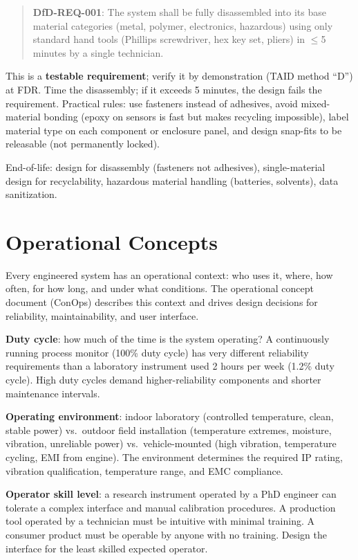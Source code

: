 \documentclass[11pt,letterpaper,twoside,openany]{book}
\begin{document}
\begin{quote}
\textbf{DfD-REQ-001}: The system shall be fully disassembled into its base material categories (metal, polymer, electronics, hazardous) using only standard hand tools (Phillips screwdriver, hex key set, pliers) in $\leq$5 minutes by a single technician.
\end{quote}

This is a \textbf{testable requirement}; verify it by demonstration (TAID method ``D'') at FDR. Time the disassembly; if it exceeds 5 minutes, the design fails the requirement. Practical rules: use fasteners instead of adhesives, avoid mixed-material bonding (epoxy on sensors is fast but makes recycling impossible), label material type on each component or enclosure panel, and design snap-fits to be releasable (not permanently locked).

End-of-life: design for disassembly (fasteners not adhesives), single-material design for recyclability, hazardous material handling (batteries, solvents), data sanitization.


\section{Operational Concepts}
Every engineered system has an operational context: who uses it, where, how often, for how long, and under what conditions. The operational concept document (ConOps) describes this context and drives design decisions for reliability, maintainability, and user interface.

\textbf{Duty cycle}: how much of the time is the system operating? A continuously running process monitor (100\% duty cycle) has very different reliability requirements than a laboratory instrument used 2 hours per week (1.2\% duty cycle). High duty cycles demand higher-reliability components and shorter maintenance intervals.

\textbf{Operating environment}: indoor laboratory (controlled temperature, clean, stable power) vs.\ outdoor field installation (temperature extremes, moisture, vibration, unreliable power) vs.\ vehicle-mounted (high vibration, temperature cycling, EMI from engine). The environment determines the required IP rating, vibration qualification, temperature range, and EMC compliance.

\textbf{Operator skill level}: a research instrument operated by a PhD engineer can tolerate a complex interface and manual calibration procedures. A production tool operated by a technician must be intuitive with minimal training. A consumer product must be operable by anyone with no training. Design the interface for the least skilled expected operator.
\end{document}
